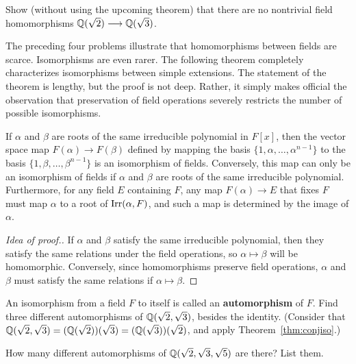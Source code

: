 \begin{problem}
    Show (without using the upcoming theorem) that there are no nontrivial field homomorphisms $\mathbb{Q}(\sqrt{2}) \longrightarrow \mathbb{Q}(\sqrt{3})$.
\end{problem}

The preceding four problems illustrate that homomorphisms between fields are scarce. Isomorphisms are even rarer. The following theorem completely characterizes isomorphisms between simple extensions. The statement of the theorem is lengthy, but the proof is not deep. Rather, it simply makes official the observation that preservation of field operations severely restricts the number of possible isomorphisms.

\begin{theorem}\label{thm:conjiso}
If $\alpha$ and $\beta$ are roots of the same irreducible polynomial in $F[x]$, then the vector space map $F(\alpha) \longrightarrow F(\beta)$ defined by mapping the basis $\{1, \alpha, \ldots, \alpha^{n-1}\}$ to the basis $\{1, \beta, \ldots, \beta^{n-1}\}$ is an isomorphism of fields.  Conversely, this map can only be an isomorphism of fields if $\alpha$ and $\beta$ are roots of the same irreducible polynomial.  Furthermore, for any field $E$ containing $F$, any map $F(\alpha) \longrightarrow E$ that fixes $F$ must map $\alpha$ to a root of $\operatorname{Irr}(\alpha,F)$, and such a map is determined by the image of $\alpha$.
\end{theorem}

\begin{proof}[Idea of proof.] If $\alpha$ and $\beta$ satisfy the same irreducible polynomial, then they satisfy the same relations under the field operations, so $\alpha \mapsto \beta$ will be homomorphic. Conversely, since homomorphisms preserve field operations, $\alpha$ and $\beta$ must satisfy the same relations if $\alpha \mapsto \beta$.
\end{proof}

\begin{problem}\label{prob:conjiso1}
    An isomorphism from a field $F$ to itself is called an \textbf{automorphism} of $F$. Find three different automorphisms of $\mathbb{Q}(\sqrt{2},\sqrt{3})$, besides the identity. (Consider that $\mathbb{Q}(\sqrt{2},\sqrt{3})=(\mathbb{Q}(\sqrt{2}))(\sqrt{3})=(\mathbb{Q}(\sqrt{3}))(\sqrt{2})$, and apply Theorem~\ref{thm:conjiso}.)
\end{problem}

\begin{problem}\label{prob:conjiso2}
    How many different automorphisms of $\mathbb{Q}(\sqrt{2},\sqrt{3},\sqrt{5})$ are there? List them.
\begin{annotation}
\end{annotation}
\end{problem}

